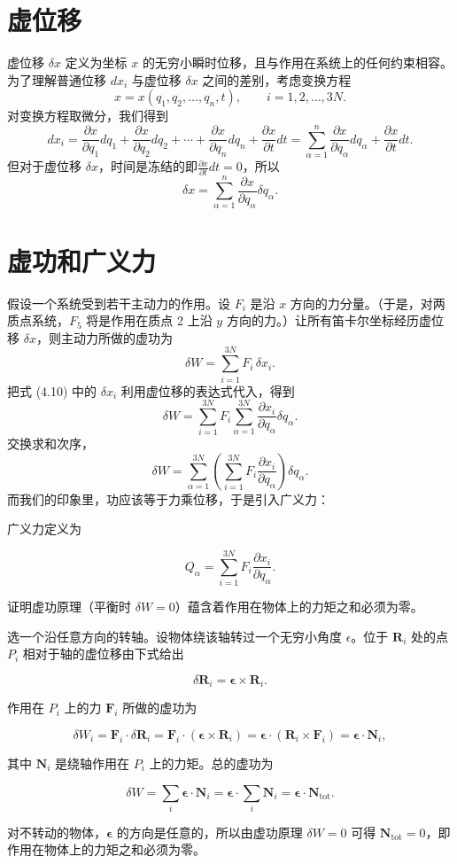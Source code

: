 \section{虚位移}
虚位移 $\delta x$ 定义为坐标 $x$ 的无穷小瞬时位移，且与作用在系统上的任何约束相容。 为了理解普通位移 $dx_i$ 与虚位移 $\delta x$ 之间的差别，考虑变换方程$$x = x(q_1, q_2, \ldots, q_n, t), \qquad i = 1, 2, \ldots, 3N.$$ 对变换方程取微分，我们得到$$dx_i = \frac{\partial x}{\partial q_1}dq_1 + \frac{\partial x}{\partial q_2}dq_2 + \cdots + \frac{\partial x}{\partial q_n}dq_n + \frac{\partial x}{\partial t}dt = \sum_{\alpha=1}^{n}\frac{\partial x}{\partial q_\alpha}dq_\alpha + \frac{\partial x}{\partial t}dt.$$ 但对于虚位移 $\delta x$，时间是冻结的即$\frac{\partial x}{\partial t}dt=0$，所以$$\delta x = \sum_{\alpha=1}^{n}\frac{\partial x}{\partial q_\alpha}\delta q_\alpha. $$
\section{虚功和广义力}
假设一个系统受到若干主动力的作用。设 $F_i$ 是沿 $x$ 方向的力分量。（于是，对两质点系统，$F_5$ 将是作用在质点 2 上沿 $y$ 方向的力。）让所有笛卡尔坐标经历虚位移 $\delta x$，则主动力所做的虚功为
\[
\delta W = \sum_{i=1}^{3N}F_i\,\delta x_i.
\]
把式 (4.10) 中的 $\delta x_i$ 利用虚位移的表达式代入，得到
\[
\delta W = \sum_{i=1}^{3N}F_i\sum_{\alpha=1}^{3N}\frac{\partial x_i}{\partial q_\alpha}\delta q_\alpha.
\]
交换求和次序，
\[
\delta W = \sum_{\alpha=1}^{3N}\left(\sum_{i=1}^{3N}F_i\frac{\partial x_i}{\partial q_\alpha}\right)\delta q_\alpha.
\]
而我们的印象里，功应该等于力乘位移，于是引入广义力：
\begin{definition}[广义力]
广义力定义为

\[
Q_\alpha = \sum_{i=1}^{3N}F_i\frac{\partial x_i}{\partial q_\alpha}.
\]
\end{definition}
\begin{example}[例题 4.3（虚功原理蕴含合力矩为零）]
证明虚功原理（平衡时 $\delta W = 0$）蕴含着作用在物体上的力矩之和必须为零。
\end{example}
\begin{solution}
选一个沿任意方向的转轴。设物体绕该轴转过一个无穷小角度 $\epsilon$。位于 $\mathbf{R}_i$ 处的点 $P_i$ 相对于轴的虚位移由下式给出

\[
\delta\mathbf{R}_i = \boldsymbol{\epsilon}\times\mathbf{R}_i.
\]

作用在 $P_i$ 上的力 $\mathbf{F}_i$ 所做的虚功为

\[
\delta W_i = \mathbf{F}_i\cdot\delta\mathbf{R}_i = \mathbf{F}_i\cdot(\boldsymbol{\epsilon}\times\mathbf{R}_i) = \boldsymbol{\epsilon}\cdot(\mathbf{R}_i\times\mathbf{F}_i) = \boldsymbol{\epsilon}\cdot\mathbf{N}_i,
\]

其中 $\mathbf{N}_i$ 是绕轴作用在 $P_i$ 上的力矩。总的虚功为

\[
\delta W = \sum_i \boldsymbol{\epsilon}\cdot\mathbf{N}_i = \boldsymbol{\epsilon}\cdot\sum_i\mathbf{N}_i = \boldsymbol{\epsilon}\cdot\mathbf{N}_{\mathrm{tot}}.
\]

对不转动的物体，$\boldsymbol{\epsilon}$ 的方向是任意的，所以由虚功原理 $\delta W = 0$ 可得 $\mathbf{N}_{\mathrm{tot}} = 0$，即作用在物体上的力矩之和必须为零。
\end{solution}
